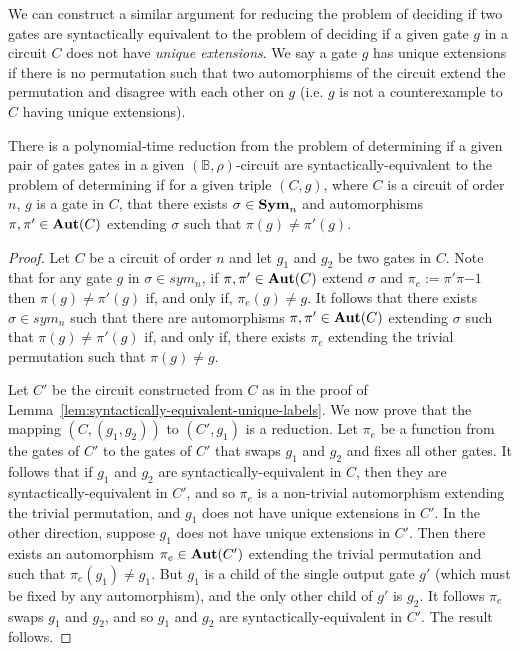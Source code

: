 \documentclass[../paper.tex]{subfiles}
\begin{document}
We can construct a similar argument for reducing the problem of deciding if two
gates are syntactically equivalent to the problem of deciding if a given gate
$g$ in a circuit $C$ does not have \emph{unique extensions}. We say a gate $g$
has unique extensions if there is no permutation such that two automorphisms of
the circuit extend the permutation and disagree with each other on $g$ (i.e. $g$
is not a counterexample to $C$ having unique extensions).

\begin{lem}
  There is a polynomial-time reduction from the problem of determining if a
  given pair of gates gates in a given $(\mathbb{B}, \rho)$-circuit are
  syntactically-equivalent to the problem of determining if for a given triple
  $(C, g)$, where $C$ is a circuit of order $n$, $g$ is a gate in $C$, that
  there exists $\sigma \in \text{\textbf{Sym}}_n$ and automorphisms $\pi, \pi' \in \text{\textbf{Aut}}(C)$
  extending $\sigma$ such that $\pi (g) \neq \pi' (g)$.
  \label{lem:syntactically-equivilent-unique-extensions}
\end{lem}
\begin{proof}
  Let $C$ be a circuit of order $n$ and let $g_1$ and $g_2$ be two gates in $C$.
  Note that for any gate $g$ in $\sigma \in sym_n$, if $\pi, \pi' \in \text{\textbf{Aut}}(C)$
  extend $\sigma$ and $\pi_e := \pi'\pi{-1}$ then $\pi(g) \neq \pi'(g)$ if, and
  only if, $\pi_e (g) \neq g$. It follows that there exists $\sigma \in sym_n$
  such that there are automorphisms $\pi, \pi' \in \text{\textbf{Aut}}(C)$ extending $\sigma$
  such that $\pi (g) \neq \pi'(g)$ if, and only if, there exists $\pi_e$
  extending the trivial permutation such that $\pi (g) \neq g$.

  Let $C'$ be the circuit constructed from $C$ as in the proof of
  Lemma~\ref{lem:syntactically-equivalent-unique-labels}. We now prove that the
  mapping $(C, (g_1, g_2))$ to $(C', g_1)$ is a reduction. Let $\pi_e$ be a
  function from the gates of $C'$ to the gates of $C'$ that swaps $g_1$ and
  $g_2$ and fixes all other gates. It follows that if $g_1$ and $g_2$ are
  syntactically-equivalent in $C$, then they are syntactically-equivalent in
  $C'$, and so $\pi_e$ is a non-trivial automorphism extending the trivial
  permutation, and $g_1$ does not have unique extensions in $C'$. In the other
  direction, suppose $g_1$ does not have unique extensions in $C'$. Then there
  exists an automorphism $\pi_e \in \text{\textbf{Aut}}(C')$ extending the trivial permutation
  and such that $\pi_e(g_1) \neq g_1$. But $g_1$ is a child of the single output
  gate $g'$ (which must be fixed by any automorphism), and the only other child
  of $g'$ is $g_2$. It follows $\pi_e$ swaps $g_1$ and $g_2$, and so $g_1$ and
  $g_2$ are syntactically-equivalent in $C'$. The result follows.
\end{proof}
\end{document}
